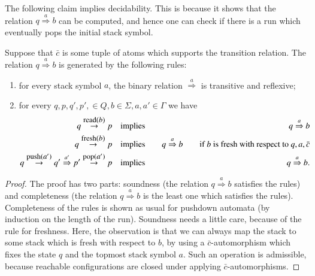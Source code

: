 {The following claim implies decidability. This is because it shows that the relation $q \stackrel a \Rightarrow b$ can be computed, and hence one can check if there is a run which eventually pops the initial stack symbol.
\begin{claim} Suppose that $\bar c$ is some tuple of atoms which supports the transition relation. 
The relation $q \stackrel a \Rightarrow b$ is generated by the following rules:
\begin{enumerate}
	\item for every stack symbol $a$, the binary relation $\stackrel a \Rightarrow$ is transitive and reflexive;
	\item for every $q,p,q',p', \in Q, b \in \Sigma, a,a' \in \Gamma$ we have
	\begin{eqnarray*}
  q \stackrel  {\text{\small read($b$)}} \to p \quad &\text{implies}& \quad q \stackrel a \Rightarrow b
\\  q \stackrel  {\text{\small fresh($b$)}} \to p \quad &\text{implies}& \quad q \stackrel a \Rightarrow b   \qquad \mbox{if $b$ is fresh with respect to $q,a,\bar c$}\\
  q \stackrel  {\text{\small push($a'$)}} \to q' \stackrel {a'} \Rightarrow p' \stackrel  {\text{\small pop($a'$)}} \to p   \quad &\text{implies}& \quad q \stackrel a \Rightarrow b.
\end{eqnarray*}
\end{enumerate}
\end{claim}
\begin{proof}
The proof has two parts: soundness (the relation $q \stackrel a \Rightarrow b$ satisfies the rules) and completeness (the relation $q \stackrel a \Rightarrow b$ is the least one which satisfies the rules).
	Completeness of the rules is shown as usual for pushdown automata (by induction on the length of the run). Soundness needs a little care, because of the rule for freshness. Here, the observation is that we can always map the  stack  to some stack which is fresh with respect to $b$, by using a $\bar c$-automorphism which fixes the state $q$ and the topmost stack symbol $a$. Such an operation is admissible, because reachable configurations are closed under applying $\bar c$-automorphisms.
\end{proof}}


	

	
	

